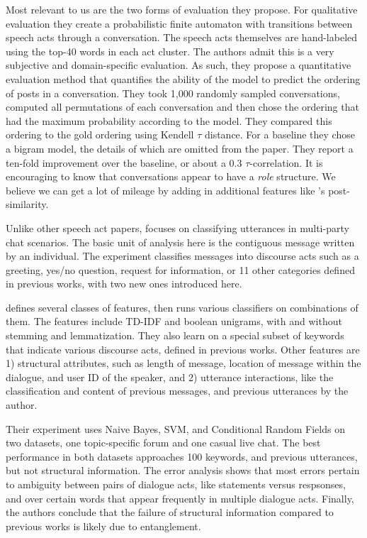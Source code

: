 \documentclass[11pt]{article}
\begin{document}
Most relevant to us are the two forms of evaluation they propose. For
qualitative evaluation they create a probabilistic finite automaton with
transitions between speech acts through a conversation. The speech acts
themselves are hand-labeled using the top-40 words in each act cluster. The 
authors admit this is a very subjective and domain-specific evaluation. As such,
they propose a quantitative evaluation method that quantifies the ability of
the model to predict the ordering of posts in a conversation. They took
1,000 randomly sampled conversations, computed all permutations
of each conversation and then chose the ordering that had the maximum
probability according to the model. They compared this ordering to the gold
ordering using Kendell $\tau$ distance. For a baseline they chose a bigram
model, the details of which are omitted from the paper. They report a ten-fold improvement
over the baseline, or about a 0.3 $\tau$-correlation. It is encouraging to know
that conversations appear to have a \textit{role} structure. We believe we can get a lot of mileage
by adding in additional features like \cite{Wang2008a}'s post-similarity.

Unlike other speech act papers, \cite{Kim2012} focuses on classifying utterances
in multi-party chat scenarios. The basic unit
of analysis here is the contiguous message written by an individual. The
experiment classifies messages into discourse acts such as a greeting, yes/no
question, request for information, or 11 other categories defined in previous
works, with two new ones introduced here.

\cite{Kim2012} defines several classes of features, then runs various classifiers on
combinations of them. The features include TD-IDF and boolean unigrams, with
and without stemming and lemmatization. They also learn on a special subset of
keywords that indicate various discourse acts, defined in previous works. Other
features are 1) structural attributes, such as length of message, location of
message within the dialogue, and user ID of the speaker, and 2) utterance
interactions, like the classification and content of previous messages, and
previous utterances by the author.

Their experiment uses Naive Bayes, SVM, and Conditional Random Fields on two
datasets, one topic-specific forum and one casual live chat. The best
performance in both datasets approaches 100%
keywords, and previous utterances, but not structural information. The error
analysis shows that most errors pertain to ambiguity between pairs of dialogue
acts, like statements versus respsonses, and over certain words that appear
frequently in multiple dialogue acts. Finally, the authors conclude that the
failure of structural information compared to previous works is likely due to
entanglement.
\end{document}
